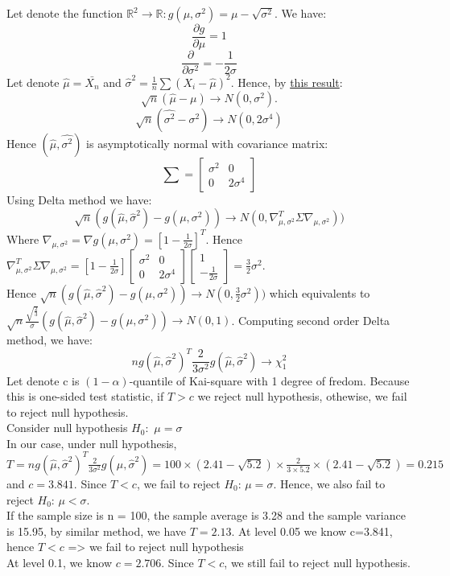 \documentclass[10pt]{article}
\newenvironment{problem}[2][Problem]{\begin{trivlist}
\item[\hskip \labelsep {\bfseries #1}\hskip \labelsep {\bfseries #2.}]}{\end{trivlist}}
\begin{document}
\begin{problem}{3}
Let denote the function $\mathbb{R}^{2} \longrightarrow \mathbb{R}: g(\mu, \sigma^2)=\mu -\sqrt{\sigma^2}$. We have:
\[ \frac{\partial g}{\partial \mu}=1 \]
\[ \frac{\partial}{\partial \sigma^{2}}= -\frac{1}{2\sigma}\]
Let denote $\hat{\mu}=\bar{X_n}$ and $\hat{\sigma}^{2}=\frac{1}{n}\sum(X_i-\hat{\mu})^{2}$. Hence, by \href{https://alecospapadopoulos.files.wordpress.com/2016/03/asympt-distr-of-sample-variance-dichotomous-rvs-technical-report.pdf}{this result}: 
\[ \sqrt{n}(\hat{\mu}-\mu) \longrightarrow N(0, \sigma^2).\]
\[ \sqrt{n}(\hat{\sigma^2}- \sigma^2) \longrightarrow N(0, 2\sigma^{4}) \]
Hence $(\hat{\mu}, \hat{\sigma^2})$ is asymptotically normal with covariance matrix:
\[\sum= 
\begin{bmatrix}
    \sigma^2 & 0\\
    0 & 2\sigma^4
\end{bmatrix}
 \] 
Using Delta method we have: 
\[ \sqrt{n}(g(\hat{\mu}, \hat{\sigma}^2) - g(\mu, \sigma^2)) \longrightarrow N(0, \nabla_{\mu, \sigma^2}^{T} \Sigma \nabla_{\mu, \sigma^2} ))\]
Where $\nabla_{\mu, \sigma^2}= \nabla g(\mu, \sigma^2)=[1 -\frac{1}{2\sigma}]^{T}$. Hence $\nabla_{\mu, \sigma^2}^{T} \Sigma \nabla_{\mu, \sigma^2}=[1 -\frac{1}{2\sigma}]\begin{bmatrix}
    \sigma^2 & 0\\
    0 & 2\sigma^4
\end{bmatrix} 
\begin{bmatrix}
    1 \\
     -\frac{1}{2\sigma}
\end{bmatrix}=\frac{3}{2}\sigma^2$.\\
Hence $ \sqrt{n}(g(\hat{\mu}, \hat{\sigma}^2) - g(\mu, \sigma^2)) \longrightarrow N(0, \frac{3}{2}\sigma^2 )) $ which equivalents to $ \sqrt{n}\frac{\sqrt{\frac{2}{3}}}{\sigma}(g(\hat{\mu}, \hat{\sigma}^2) - g(\mu, \sigma^2)) \longrightarrow N(0, 1)$. Computing second order Delta method, we have:
\[ n g(\hat{\mu}, \hat{\sigma}^2)^{T} \frac{2}{3\sigma^2} g(\hat{\mu}, \hat{\sigma}^2)  \longrightarrow \chi_{1}^{2}\]
Let denote c is $(1-\alpha)$-quantile of Kai-square with 1 degree of fredom. Because this is one-sided test statistic, if $T>c$ we reject null hypothesis, othewise, we fail to reject null hypothesis.\\
Consider null hypothesis $H_0:$ $\mu = \sigma$\\
In our case, under null hypothesis, $T=n g(\hat{\mu}, \hat{\sigma}^2)^{T} \frac{2}{3\sigma^2} g(\hat{\mu}, \hat{\sigma}^2) =  100 \times (2.41-\sqrt{5.2}) \times \frac{2}{3\times 5.2} \times (2.41-\sqrt{5.2})= 0.215 $ and $c=3.841$. Since $T<c$, we fail to reject $H_0$: $\mu = \sigma$. Hence, we also fail to reject $H_0$: $\mu<\sigma$.\\
If the sample size is n = 100, the sample average is 3.28 and the sample variance is 15.95, by similar method, we have $T=2.13$. At level 0.05 we know c=3.841, hence $T<c$ => we fail to reject null hypothesis\\
At level 0.1, we know $c=2.706$. Since $T<c$, we still fail to reject null hypothesis. 

\end{problem}
\end{document}
